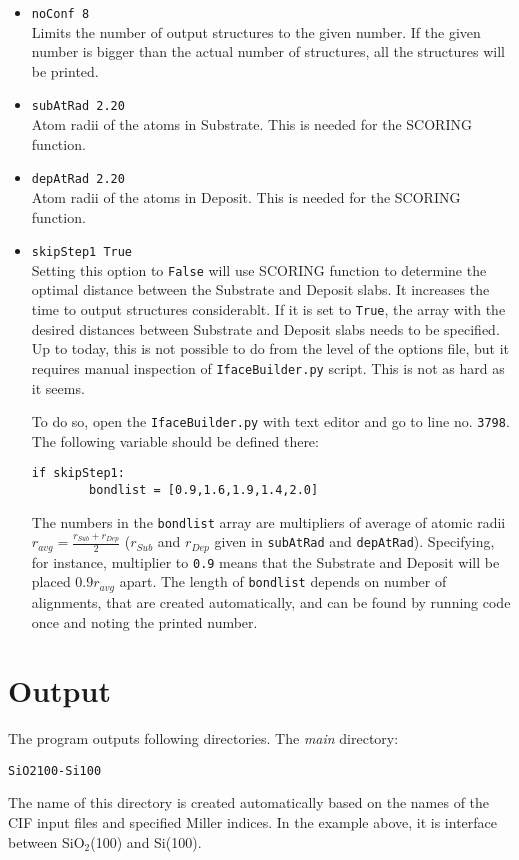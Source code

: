 \documentclass[a4paper,12pt,oneside]{article}
\begin{document}
\begin{itemize}
\item{\texttt{noConf   8}}\\
Limits the number of output structures to the given number. 
If the given number is bigger than the actual number of structures, all the 
structures will be printed. 

\item{\texttt{subAtRad   2.20}}\\
Atom radii of the atoms in Substrate. This is needed for the SCORING function. 

\item{\texttt{depAtRad   2.20}}\\
Atom radii of the atoms in Deposit. This is needed for the SCORING function.

\item{\texttt{skipStep1  True}}\\
Setting this option to \texttt{False} will use SCORING function to determine the
optimal distance between the Substrate and Deposit slabs. It increases the time
to output structures considerablt. 
If it is set to \texttt{True}, the array with the desired distances between
Substrate and Deposit slabs needs to be specified. Up to today, this is not
possible to do from the level of the options file, but it requires manual
inspection of \texttt{IfaceBuilder.py} script. This is not as hard as it seems.

To do so, open the \texttt{IfaceBuilder.py} with text editor and go to line no.
\texttt{3798}. The following variable should be defined there:
\begin{verbatim}
if skipStep1:
        bondlist = [0.9,1.6,1.9,1.4,2.0]
\end{verbatim}

\noindent
The numbers in the \texttt{bondlist} array are multipliers of average of atomic
radii $r_{avg}=\frac{r_{Sub}+r_{Dep}}{2}$ ($r_{Sub}$ and $r_{Dep}$ given in
\texttt{subAtRad} and \texttt{depAtRad}). Specifying, for instance, multiplier
to \texttt{0.9} means that the Substrate and Deposit will be placed $0.9r_{avg}$
apart. The length of \texttt{bondlist} depends on number of alignments, that 
are created automatically, and can be found by running code once and noting the
printed number.

\end{itemize}

\section{Output}
The program outputs following directories. The \textit{main} directory:
\begin{verbatim}
SiO2100-Si100
\end{verbatim}
The name of this directory is created automatically based on the names of the
CIF input files and specified Miller indices. In the example above, 
it is interface between SiO$_2$(100) and Si(100). 
\end{document}
